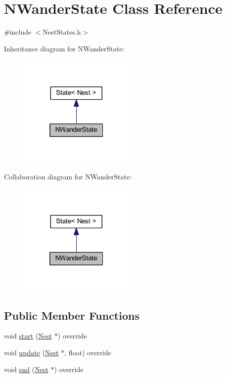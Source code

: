 \hypertarget{class_n_wander_state}{}\section{N\+Wander\+State Class Reference}
\label{class_n_wander_state}


{\ttfamily \#include $<$Nest\+States.\+h$>$}



Inheritance diagram for N\+Wander\+State\+:
\nopagebreak
\begin{figure}[H]
\begin{center}
\leavevmode
\includegraphics[width=160pt]{class_n_wander_state__inherit__graph}
\end{center}
\end{figure}


Collaboration diagram for N\+Wander\+State\+:
\nopagebreak
\begin{figure}[H]
\begin{center}
\leavevmode
\includegraphics[width=160pt]{class_n_wander_state__coll__graph}
\end{center}
\end{figure}
\subsection*{Public Member Functions}
\begin{DoxyCompactItemize}
\item 
void \hyperlink{class_n_wander_state_a8f0f059e756935283e903fa4647a7c3d}{start} (\hyperlink{class_nest}{Nest} $\ast$) override
\item 
void \hyperlink{class_n_wander_state_aa6245a3229ba7f0231e4d2bad59a0789}{update} (\hyperlink{class_nest}{Nest} $\ast$, float) override
\item 
void \hyperlink{class_n_wander_state_acfff1d26985924da7d3c540a9399dd1d}{end} (\hyperlink{class_nest}{Nest} $\ast$) override
\end{DoxyCompactItemize}
